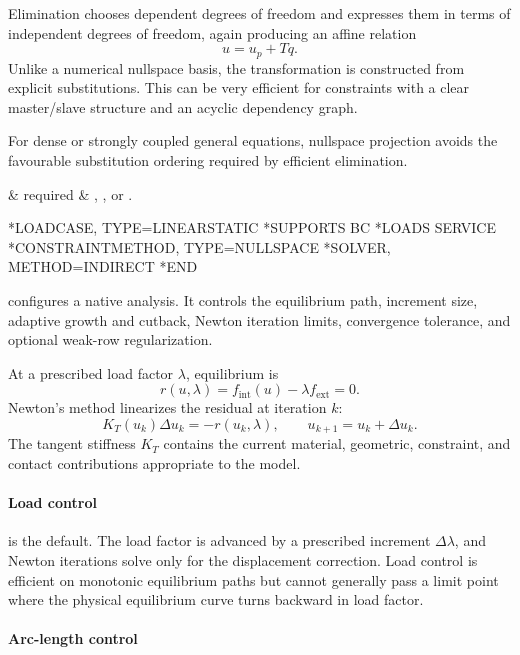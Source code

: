 Elimination chooses dependent degrees of freedom and expresses them in terms of independent degrees of freedom, again producing an affine relation
\[
u=u_p+Tq.
\]
Unlike a numerical nullspace basis, the transformation is constructed from explicit substitutions. This can be very efficient for constraints with a clear master/slave structure and an acyclic dependency graph.

For dense or strongly coupled general equations, nullspace projection avoids the favourable substitution ordering required by efficient elimination.

\begin{keywordparameters}
 & required & , , or . \\
\end{keywordparameters}

\exampleheading
\begin{inputdeck}
*LOADCASE, TYPE=LINEARSTATIC
*SUPPORTS
BC
*LOADS
SERVICE
*CONSTRAINTMETHOD, TYPE=NULLSPACE
*SOLVER, METHOD=INDIRECT
*END
\end{inputdeck}


 configures a native  analysis. It controls the equilibrium path, increment size, adaptive growth and cutback, Newton iteration limits, convergence tolerance, and optional weak-row regularization.

At a prescribed load factor \(\lambda\), equilibrium is
\[
r(u,\lambda)=f_\mathrm{int}(u)-\lambda f_\mathrm{ext}=0.
\]
Newton's method linearizes the residual at iteration \(k\):
\[
K_T(u_k)\Delta u_k=-r(u_k,\lambda),
\qquad
u_{k+1}=u_k+\Delta u_k.
\]
The tangent stiffness \(K_T\) contains the current material, geometric, constraint, and contact contributions appropriate to the model.

\paragraph*{Load control}

 is the default. The load factor is advanced by a prescribed increment \(\Delta\lambda\), and Newton iterations solve only for the displacement correction. Load control is efficient on monotonic equilibrium paths but cannot generally pass a limit point where the physical equilibrium curve turns backward in load factor.

\paragraph*{Arc-length control}


